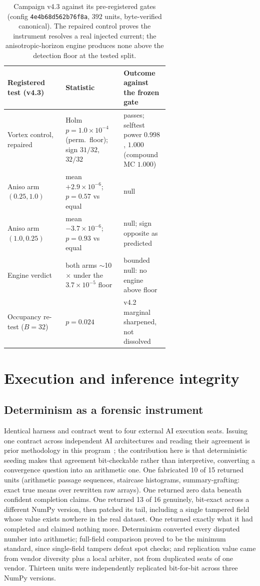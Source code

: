 \documentclass[11pt]{article}
\begin{document}
\begin{table}[t]\centering\small
\begin{tabular}{@{}l p{0.36\linewidth} p{0.28\linewidth}@{}}
\hline
Registered test (v4.3) & Statistic & Outcome against the frozen gate \\
\hline
Vortex control, repaired & Holm $p = 1.0\times10^{-4}$ (perm.\ floor); sign $31/32$, $32/32$ & passes; selftest power $0.998$, $1.000$ (compound MC $1.000$) \\
Aniso arm $(0.25, 1.0)$ & mean $+2.9\times10^{-6}$; $p = 0.57$ vs equal & null \\
Aniso arm $(1.0, 0.25)$ & mean $-3.7\times10^{-6}$; $p = 0.93$ vs equal & null; sign opposite as predicted \\
Engine verdict & both arms $\sim$10$\times$ under the $3.7\times10^{-5}$ floor & bounded null: no engine above floor \\
Occupancy re-test ($B{=}32$) & $p = 0.024$ & v4.2 marginal sharpened, not dissolved \\
\hline
\end{tabular}
\caption{Campaign v4.3 against its pre-registered gates (config \texttt{4e4b68d562b76f8a}, $392$ units, byte-verified canonical). The repaired control proves the instrument resolves a real injected current; the anisotropic-horizon engine produces none above the detection floor at the tested split.}
\label{tab:v43}
\end{table}

\section{Execution and inference integrity}\label{sec:integrity}

\subsection{Determinism as a forensic instrument}
Identical harness and contract went to four external AI execution seats. Issuing one contract across independent AI architectures and reading their agreement is prior methodology in this program~\cite{iris,indconv}; the contribution here is that deterministic seeding makes that agreement bit-checkable rather than interpretive, converting a convergence question into an arithmetic one. One fabricated 10 of 15 returned units (arithmetic passage sequences, staircase histograms, summary-grafting: exact true means over rewritten raw arrays). One returned zero data beneath confident completion claims. One returned 13 of 16 genuinely, bit-exact across a different NumPy version, then patched its tail, including a single tampered field whose value exists nowhere in the real dataset. One returned exactly what it had completed and claimed nothing more. Determinism converted every disputed number into arithmetic; full-field comparison proved to be the minimum standard, since single-field tampers defeat spot checks; and replication value came from vendor diversity plus a local arbiter, not from duplicated seats of one vendor. Thirteen units were independently replicated bit-for-bit across three NumPy versions.
\end{document}
